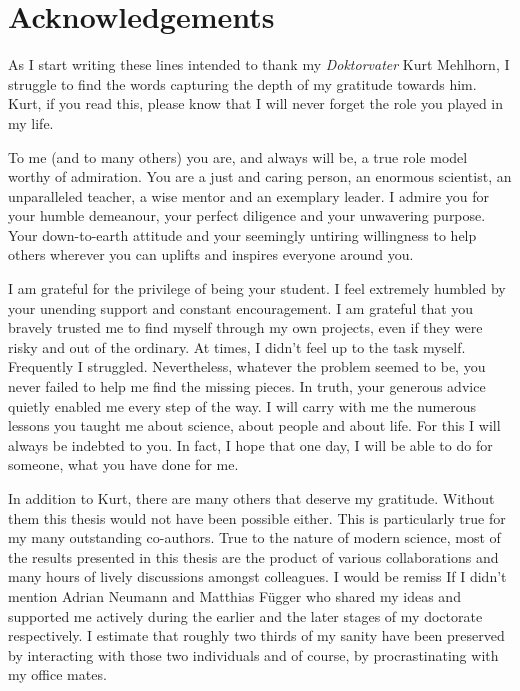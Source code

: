 \null\vfill

\section*{Acknowledgements}
	
	As I start writing these lines intended to thank my \emph{Doktorvater} Kurt Mehlhorn, I struggle to find the words capturing the depth of my gratitude towards him. Kurt, if you read this, please know that I will never forget the role you played in my life.

	To me (and to many others) you are, and always will be, a true role model worthy of admiration. You are a just and caring person, an enormous scientist, an unparalleled teacher, a wise mentor and an exemplary leader. I admire you for your humble demeanour, your perfect diligence and your unwavering purpose. Your down-to-earth attitude and your seemingly untiring willingness to help others wherever you can uplifts and inspires everyone around you.

	I am grateful for the privilege of being your student. I feel extremely humbled by your unending support and constant encouragement. I am grateful that you bravely trusted me to find myself through my own projects, even if they were risky and out of the ordinary. At times, I didn't feel up to the task myself. Frequently I struggled. Nevertheless, whatever the problem seemed to be, you never failed to help me find the missing pieces. In truth, your generous advice quietly enabled me every step of the way. I will carry with me the numerous lessons you taught me about science, about people and about life. For this I will always be indebted to you. In fact, I hope that one day, I will be able to do for someone, what you have done for me.\bigskip
	
	In addition to Kurt, there are many others that deserve my gratitude. Without them this thesis would not have been possible either. This is particularly true for my many outstanding co-authors. True to the nature of modern science, most of the results presented in this thesis are the product of various collaborations and many hours of lively discussions amongst colleagues. I would be remiss If I didn't mention Adrian Neumann and Matthias F\"ugger who shared my ideas and supported me actively during the earlier and the later stages of my doctorate respectively. I estimate that roughly two thirds of my sanity have been preserved by interacting with those two individuals and of course, by procrastinating with my office mates.\bigskip

